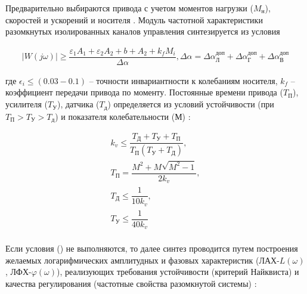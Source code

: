Предварительно выбираются привода с учетом моментов нагрузки ($M_{\textit{н}}$), скоростей и ускорений и носителя \cite[]{Babaev38-a2-13}. Модуль частотной характеристики разомкнутых изолированных каналов управления синтезируется из условия 

\begin{equation}
\label{eq:p2:14-a2}
\begin{alignedat}{2}
\left| W (j\omega) \right| \geqslant \dfrac{\varepsilon_1 A_1 + \varepsilon_2 A_2 + b + A_2 + k_f M_i }{\varDelta\alpha} ,
\varDelta\alpha = \varDelta\alpha^{\textit{доп}}_{\textit{Л}} + \varDelta\alpha^{\textit{доп}}_{\textit{Г}} + \varDelta\alpha^{\textit{доп}}_{\textit{В}}
\end{alignedat}
\end{equation}

где $\epsilon_i \leq (0.03-0.1)$ – точности инвариантности к колебаниям носителя, $k_f$ – коэффициент передачи привода по моменту. Постоянные времени привода ($T_{\textit{П}}$), усилителя ($T_{\textit{У}}$), датчика ($T_{\textit{д}}$) определяется из условий устойчивости 
(при $T_{\textit{П}}>T_{\textit{У}}>T_{\textit{д}}$) 
и показателя колебательности (М) \cite[]{Bessekerski-a2-14}:	

\begin{equation}
\label{eq:p2:15-a2}
\begin{alignedat}{2}
k_v \leq \dfrac{T_{\textit{Д}}+T_{\textit{У}}+T_{\textit{П}}}{T_{\textit{П}}(T_{\textit{У}}+T_{\textit{Д}})} ,\\
T_{\textit{П}} = \dfrac{M^2 + M\sqrt{M^2-1}}{2k_v} ,\\
T_{\textit{Д}} \leq \dfrac{1}{10k_v} ,\\
T_{\textit{У}} \leq \dfrac{1}{40k_v}\\
\end{alignedat}
\end{equation}

Если условия () не выполняются, то далее синтез проводится путем построения желаемых логарифмических амплитудных и фазовых характеристик (ЛАХ-$L(\omega)$, ЛФХ-$\varphi(\omega)$), реализующих требования устойчивости (критерий Найквиста) и качества регулирования (частотные свойства разомкнутой системы) \cite[]{Bessekerski-a2-14}:

